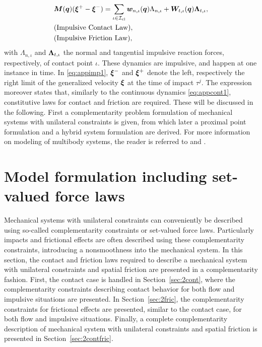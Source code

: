 \documentclass[../DC2017114Bouma.tex]{subfiles}
\begin{document}
\begin{align}
&{\boldsymbol{M}}({\boldsymbol{q}})(\boldsymbol{\xi}^+ - \boldsymbol{\xi}^-) = \sum_{\iota\in\mathcal{I}_{\text{cl}}} {\boldsymbol{w}}_{n,\iota}({\boldsymbol{q}})\Lambda_{n,\iota} + {\boldsymbol{W}}_{t,\iota}({\boldsymbol{q}})\boldsymbol{\Lambda}_{t,\iota}, \label{eq:appimp1}\\
&\text{(Impulsive Contact Law)},\nonumber\\
&\text{(Impulsive Friction Law)},\nonumber
\end{align}
with $\Lambda_{n,\iota}$ and $\boldsymbol{\Lambda}_{t,\iota}$ the normal and tangential impulsive reaction forces, respectively, of contact point $\iota$. These dynamics are impulsive, and happen at one instance in time. In \eqref{eq:appimp1}, $\boldsymbol{\xi}^-$ and $\boldsymbol{\xi}^+$ denote the left, respectively the right limit of the generalized velocity $\boldsymbol{\xi}$ at the time of impact $\tau^j$. The expression moreover states that, similarly to the continuous dynamics \eqref{eq:appcont1}, constitutive laws for contact and friction are required. These will be discussed in the following. First a complementarity problem formulation of mechanical systems with unilateral constraints is given, from which later a proximal point formulation and a hybrid system formulation are derived. For more information on modeling of multibody systems, the reader is referred to \cite{Leine2008} and \cite{Wouw2016}.

\section{Model formulation including set-valued force laws}\label{sec:comp}
Mechanical systems with unilateral constraints can conveniently be described using so-called complementarity constraints or set-valued force laws. Particularly impacts and frictional effects are often described using these complementarity constraints, introducing a nonsmoothness into the mechanical system. In this section, the contact and friction laws required to describe a mechanical system with unilateral constraints and spatial friction are presented in a complementarity fashion. First, the contact case is handled in Section~\ref{sec:2cont}, where the complementarity constraints describing contact behavior for both flow and impulsive situations are presented. In Section~\ref{sec:2fric}, the complementarity constraints for frictional effects are presented, similar to the contact case, for both flow and impulsive situations. Finally, a complete complementarity description of mechanical system with unilateral constraints and spatial friction is presented in Section~\ref{sec:2contfric}.
\end{document}
